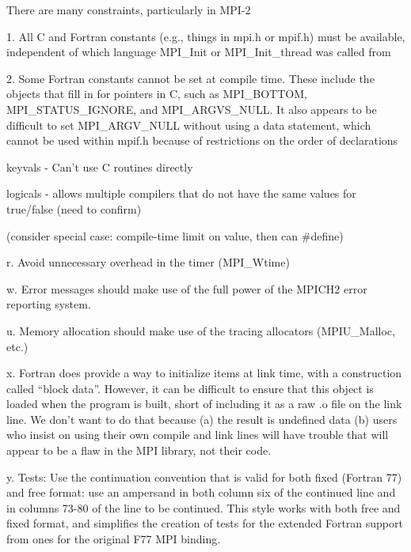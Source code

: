 % 
%
There are many constraints, particularly in MPI-2

1.  All C and Fortran constants (e.g., things in mpi.h or mpif.h) must
    be available, independent of which language MPI_Init or MPI_Init_thread 
    was called from

2.  Some Fortran constants cannot be set at compile time.  These include
    the objects that fill in for pointers in C, such as MPI_BOTTOM,
    MPI_STATUS_IGNORE, and MPI_ARGVS_NULL.  It also appears to 
    be difficult to set MPI_ARGV_NULL without using a data statement,
    which cannot be used within mpif.h because of restrictions on the
    order of declarations

keyvals - Can't use C routines directly

logicals - allows multiple compilers that do not have the same values 
for true/false (need to confirm)

    (consider special case: compile-time limit on value, then can #define)

r.  Avoid unnecessary overhead in the timer (MPI_Wtime)

w.  Error messages should make use of the full power of the MPICH2 error 
    reporting system.  

u.  Memory allocation should make use of the tracing allocators (MPIU_Malloc,
    etc.)

x.  Fortran does provide a way to initialize items at link time, with
    a construction called ``block data''.  However, it can be difficult to 
    ensure that this object is loaded when the program is built, short of 
    including it as a raw .o file on the link line.  We don't want to do that
    because (a) the result is undefined data (b) users who insist on 
    using their own compile and link lines will have trouble that will 
    appear to be a flaw in the MPI library, not their code.

y.  Tests: Use the continuation convention that is valid for both
    fixed (Fortran 77) and free format: use an ampersand in both
    column six of the continued line and in columns 73-80 of the line
    to be continued.  This style works with both free and fixed
    format, and simplifies the creation of tests for the extended 
    Fortran support from ones for the original F77 MPI binding.
